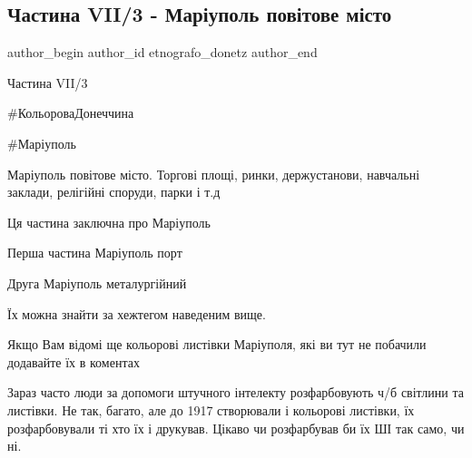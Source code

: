  
 
 
 
 

\subsection{Частина VII/3 - Маріуполь повітове місто}
\label{sec:09_05_2023.fb.etnografo_donetz.1.chastyna_vii_3_mariupol_povitove_misto}

\ifcmt
 author_begin
   author_id etnografo_donetz
 author_end
\fi

Частина VII/3

\#КольороваДонеччина 

\#Маріуполь

Маріуполь повітове місто. Торгові площі, ринки, держустанови, навчальні
заклади, релігійні споруди, парки і т.д

Ця частина заключна про Маріуполь

Перша частина Маріуполь порт 

Друга Маріуполь металургійний 

Їх можна знайти за хежтегом наведеним вище.

Якщо Вам відомі ще кольорові листівки Маріуполя, які ви тут не побачили
додавайте їх в коментах

Зараз часто люди за допомоги штучного інтелекту розфарбовують ч/б світлини та
листівки. Не так, багато, але до 1917 створювали і кольорові листівки, їх
розфарбовували ті хто їх і друкував. Цікаво чи розфарбував би їх ШІ так само,
чи ні.
